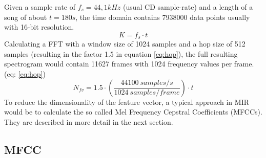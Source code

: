 Given a sample rate of $f_s = 44,1kHz$ (usual CD sample-rate) and a length of a song of about $t = 180s$, the time domain contains 7938000 data points usually with 16-bit resolution. 
\begin{equation} \label{eq:points}
K = f_s \cdot t
\end{equation}
Calculating a FFT with a window size of 1024 samples and a hop size of 512 samples (resulting in the factor 1.5 in equation \ref{eq:hop})\cite{knees1}, the full resulting spectrogram would contain 11627 frames with 1024 frequency values per frame. (eq: \ref{eq:hop}) 
\begin{equation} \label{eq:hop}
N_{fv} = 1.5 \cdot (\frac{44100 \ samples/s}{1024 \ samples/frame}) \cdot t
\end{equation}
To reduce the dimensionality of the feature vector, a typical approach in MIR would be to calculate the so called Mel Frequency Cepstral Coefficients (MFCCs). They are described in more detail in the next section.

\subsection{MFCC}\label{mfccsim}

